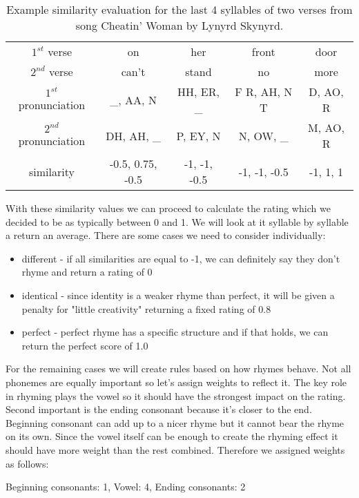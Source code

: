 \begin{table}[h!]
	\centering
	\begin{tabular}{c | c c c c} 
		$1^{st}$ verse & on & her & front & door \\ [0.5ex] 
		$2^{nd}$ verse & can't & stand & no & more \\ 
		\hline
		$1^{st}$ pronunciation & \_, AA, N & HH, ER, \_ & F R, AH, N T & D, AO, R \\
		$2^{nd}$ pronunciation & DH, AH, \_ & P, EY, N & N, OW, \_ & M, AO, R \\
		\hline
		similarity & -0.5, 0.75, -0.5 & -1, -1, -0.5 & -1, -1, -0.5 & -1, 1, 1 \\
	\end{tabular}
	\caption{Example similarity evaluation for the last 4 syllables of two verses from song Cheatin' Woman by Lynyrd Skynyrd.}
	\label{similarity_eval_table}
\end{table}

With these similarity values we can proceed to calculate the rating which we decided to be as typically between 0 and 1. We will look at it syllable by syllable a return an average. There are some cases we need to consider individually:

\begin{itemize}
	\item different - if all similarities are equal to -1, we can definitely say they don't rhyme and return a rating of 0
	\item identical - since identity is a weaker rhyme than perfect, it will be given a penalty for "little creativity" returning a fixed rating of 0.8
	\item perfect - perfect rhyme has a specific structure and if that holds, we can return the perfect score of 1.0 
\end{itemize}

For the remaining cases we will create rules based on how rhymes behave. Not all phonemes are equally important so let's assign weights to reflect it. The key role in rhyming plays the vowel so it should have the strongest impact on the rating. Second important is the ending consonant because it's closer to the end. Beginning consonant can add up to a nicer rhyme but it cannot bear the rhyme on its own. Since the vowel itself can be enough to create the rhyming effect it should have more weight than the rest combined. Therefore we assigned weights as follows:

Beginning consonants: 1,
Vowel: 4,
Ending consonants: 2

